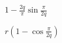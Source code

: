 \documentclass{article}
\begin{document}
$1 - \frac{2q}{\pi}\sin\frac{\pi}{2q}$
\pagebreak

$r(1 - \cos\frac{\pi}{2q})$
\pagebreak
\end{document}
